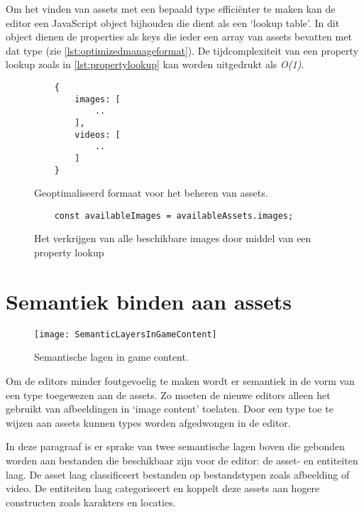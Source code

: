 Om het vinden van assets met een bepaald type efficiënter te maken kan de editor een JavaScript object bijhouden die dient als een ‘lookup table’. In dit object dienen de properties als keys die ieder een array van assets bevatten met dat type (zie \autoref{lst:optimizedmanageformat}). De tijdcomplexiteit van een property lookup zoals in \autoref{lst:propertylookup} kan worden uitgedrukt als \textit{O(1)}.

\begin{figure}[htb]
    \centering
    \lstset{language=JavaScript}
    \begin{lstlisting}
    {
        images: [
            ..
        ],
        videos: [
            ..
        ]
    }
    \end{lstlisting}
    \caption{Geoptimaliseerd formaat voor het beheren van assets.}
    \label{lst:optimizedmanageformat}
\end{figure}

\begin{figure}[htb]
    \centering
    \lstset{language=JavaScript}
    \begin{lstlisting}
    const availableImages = availableAssets.images;
    \end{lstlisting}
    \caption{Het verkrijgen van alle beschikbare images door middel van een property lookup}
    \label{lst:propertylookup}
\end{figure}

\section{Semantiek binden aan assets}

\begin{wrapfigure}{r}{0.35\textwidth}
    \texttt{[image: SemanticLayersInGameContent]}
    \caption{Semantische lagen in game content.}
    \label{fig:semanticgamecontentlayers}
    \centering
\end{wrapfigure}

Om de editors minder foutgevoelig te maken wordt er semantiek in de vorm van een type toegewezen aan de assets. Zo moeten de nieuwe editors alleen het gebruikt van afbeeldingen in ‘image content’ toelaten. Door een type toe te wijzen aan assets kunnen types worden afgedwongen in de editor. 

In deze paragraaf is er sprake van twee semantische lagen boven die gebonden worden aan bestanden die beschikbaar zijn voor de editor: de asset- en entiteiten laag. De asset laag classificeert bestanden op bestandstypen zoals afbeelding of video. De entiteiten laag categoriseert en koppelt deze assets aan hogere constructen zoals karakters en locaties. 

